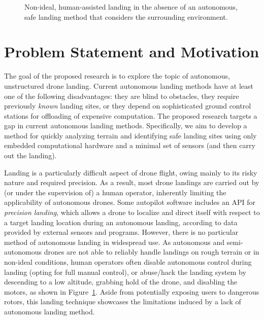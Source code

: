 \begin{figure}[ht]
    \centering
    \begin{minipage}{\wd0}
      \caption{Non-ideal, human-assisted landing in the absence of an autonomous, safe landing method that considers the surrounding environment.}
      \label{figure:hand_landing}
    \end{minipage}
\end{figure}

\section{Problem Statement and Motivation}

The goal of the proposed research is to explore the topic of
autonomous, unstructured drone landing.
Current autonomous landing methods have at least one of the following disadvantages:
they are blind to obstacles,
they require previously \textit{known} landing sites,
or they depend on sophisticated ground control stations for offloading of expensive computation.
The proposed research targets a gap in current autonomous landing methods.
Specifically, we aim to develop a method for quickly analyzing terrain
and identifying safe landing sites using only embedded computational hardware
and a minimal set of sensors (and then carry out the landing).

Landing is a particularly difficult aspect of drone flight,
owing mainly to its risky nature and required precision.
As a result, most drone landings are carried out by
(or under the supervision of)
a human operator,
inherently limiting the applicability of autonomous drones.
Some autopilot software includes an API for \textit{precision landing},
which allows a drone to localize and direct itself with respect to a target landing location during an autonomous landing,
according to data provided by external sensors and programs.
However, there is no particular method of autonomous landing in widespread use.
As autonomous and semi-autonomous drones are not able to reliably handle landings
on rough terrain or in non-ideal conditions, human operators often disable
autonomous control during landing (opting for full manual control),
or abuse/hack the landing system by descending to a low altitude,
grabbing hold of the drone,
and disabling the motors,
as shown in Figure~\ref{figure:hand_landing}.
Aside from potentially exposing users to dangerous rotors,
this landing technique showcases the limitations induced by a lack of
autonomous landing method.

